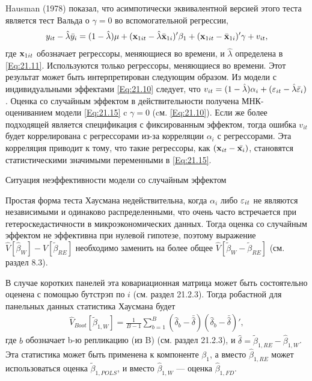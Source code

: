 Hausman (1978) показал, что асимпотически эквивалентной версией этого теста является тест Вальда о $\gamma=0$ во вспомогательной регрессии,
\begin{align}
y_{it}-\hat{\lambda}\bar{y}_i=(1-\hat{\lambda})\mu + (\mathbf{x}_{1it}-\hat{\lambda}\bar{\mathbf{x}}_{1i})'\beta_1+(\mathbf{x}_{1it}-\bar{\mathbf{x}}_{1i})'\gamma+v_{it},
\label{Eq:21.15}
\end{align}
где $\mathbf{x}_{1it}$ обозначает регрессоры, меняющиеся во времени, и $\hat{\lambda}$ определена в \ref{Eq:21.11}. Используются только регрессоры, меняющиеся во времени. Этот результат может быть интерпретирован следующим образом. Из модели с индивидуальными эффектами \ref{Eq:21.10} следует, что $v_{it}=(1-\hat{\lambda})\alpha_i+(\varepsilon_{it}-\hat{\lambda}\bar{\varepsilon}_i)$. Оценка со случайным эффектом в действительности получена МНК-оцениванием модели \ref{Eq:21.15} c $\gamma=0$ (cм. \ref{Eq:21.10}). Если же более подходящей является спецификация с фиксированным эффектом, тогда ошибка $v_{it}$ будет коррелирована с регрессорами из-за корреляции $\alpha_i$ с регрессорами. Эта корреляция приводит к тому, что такие регрессоры, как $(\mathbf{x}_{it}-\bar{\mathbf{x}_i})$, становятся статистическими значимыми переменными в \ref{Eq:21.15}.

{\centering
Ситуация неэффективности модели со случайным эффектом\\}

Простая форма теста Хаусмана недействительна, когда $\alpha_i$ либо $\varepsilon_{it}$ не являются независимыми и одинаково распределенными, что очень часто встречается при гетероскедастичности в микроэкономических данных. Тогда оценка со случайным эффектом не эффективна при нулевой гипотезе, поэтому выражение $\hat{V}[\hat{\beta}_W]-\hat{V}[\tilde{\beta}_{RE}]$ необходимо заменить на более общее $\hat{V}[\tilde{\beta}_W-\tilde{\beta}_{RE}]$ (см. раздел 8.3).

В случае коротких панелей эта ковариационная матрица может быть состоятельно оценена с помощью бутстрэп по $i$ (см. раздел 21.2.3). Тогда робастной для панельных данных статистика Хаусмана будет
\begin{align}
\hat{V}_{Boot}[\tilde{\beta}_{1,W}]=\frac{1}{B-1} \sum^B_{b=1} 
\left(\hat{\delta}_b-\bar{\hat{\delta}}\right)
\left(\hat{\delta}_b-\bar{\hat{\delta}}\right)',
\end{align}
где $b$ обозначает b-ю репликацию (из B) (см. раздел 21.2.3), и $\hat{\delta}=\tilde{\beta}_{1,RE}-\hat{\beta}_{1,W}$. Эта статистика может быть применена к компоненте $\beta_1$, а вместо $\hat{\beta}_{1,RE}$ может использоваться  оценка $\tilde{\beta}_{1,POLS}$, и вместо  $\hat{\beta}_{1,W}$ --- оценка $\hat{\beta}_{1,FD}$.

